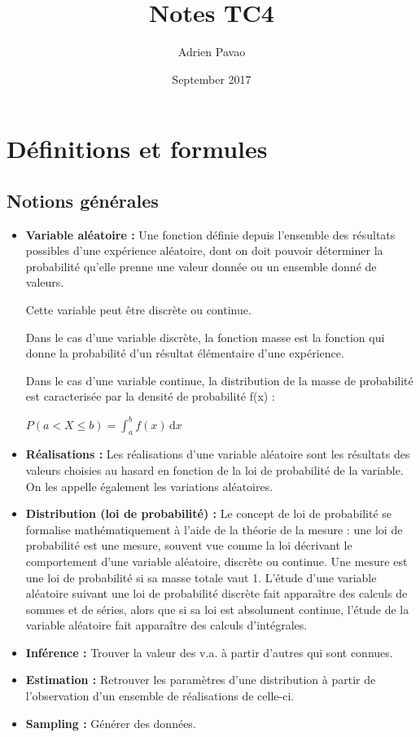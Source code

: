 \documentclass{article}
\title{Notes TC4}
\author{Adrien Pavao}
\date{September 2017}
\begin{document}
\maketitle

\tableofcontents

\section{Définitions et formules}

\subsection{Notions générales}

\begin{itemize}
\item \textbf{Variable aléatoire :} Une fonction définie depuis l'ensemble des résultats possibles d'une expérience aléatoire, dont on doit pouvoir déterminer la probabilité qu'elle prenne une valeur donnée ou un ensemble donné de valeurs. 

Cette variable peut être discrète ou continue.

Dans le cas d'une variable discrète, la fonction masse est la fonction qui donne la probabilité d'un résultat élémentaire d'une expérience.

Dans le cas d'une variable continue, la distribution de la masse de probabilité est caracterisée par la densité de probabilité f(x) : 

$ P(a < X \leq b)  = \displaystyle \int_{a}^{b} f(x) \, \mathrm{d}x  $

\item \textbf{Réalisations :} Les réalisations d'une variable aléatoire sont les résultats des valeurs choisies au hasard en fonction de la loi de probabilité de la variable. On les appelle également les variations aléatoires.

\item \textbf{Distribution (loi de probabilité) :} Le concept de loi de probabilité se formalise mathématiquement à l'aide de la théorie de la mesure : une loi de probabilité est une mesure, souvent vue comme la loi décrivant le comportement d'une variable aléatoire, discrète ou continue. Une mesure est une loi de probabilité si sa masse totale vaut 1. L'étude d'une variable aléatoire suivant une loi de probabilité discrète fait apparaître des calculs de sommes et de séries, alors que si sa loi est absolument continue, l'étude de la variable aléatoire fait apparaître des calculs d'intégrales.

\item \textbf{Inférence :} Trouver la valeur des v.a. à partir d'autres qui sont connues.

\item \textbf{Estimation :} Retrouver les paramètres d'une distribution à partir de l'observation d'un ensemble de réalisations de celle-ci.

\item \textbf{Sampling :} Générer des données.

\end{itemize}
\end{document}
